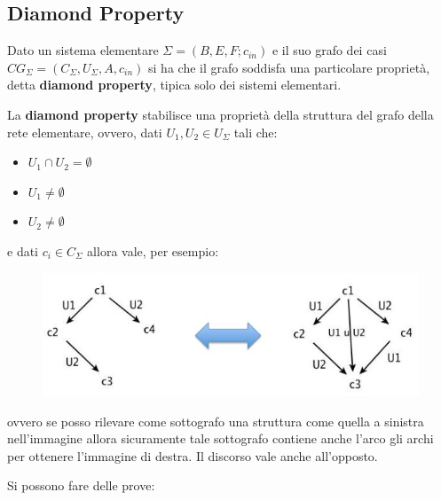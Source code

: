 \documentclass[a4paper,12pt, oneside]{book}
\begin{document}
\subsection{Diamond Property}
Dato un sistema elementare $\Sigma = (B,E,F;c_{in})$ e il suo grafo dei casi
$CG_\Sigma=(C_\Sigma, U_\Sigma, A, c_{in})$ si ha 
che il grafo soddisfa una particolare proprietà, detta \textbf{diamond
  property}, tipica solo dei sistemi elementari.
\begin{definizione}
  La \textbf{diamond property} stabilisce una proprietà della struttura del
  grafo della rete elementare, ovvero, dati $U_1,U_2\in U_\Sigma$ tali che:
  \begin{itemize}
    \item $U_1\cap U_2=\emptyset$
    \item $U_1\neq\emptyset$
    \item $U_2\neq\emptyset$
  \end{itemize}
  e dati $c_i\in C_\Sigma$ allora vale, per esempio:
  \begin{figure}[H]
    \centering
    \includegraphics[scale = 0.6]{img/diam.jpg}
  \end{figure}
  ovvero se posso rilevare come sottografo una struttura come quella a sinistra
  nell'immagine allora sicuramente tale sottografo contiene anche l'arco gli
  archi per ottenere l'immagine di destra. Il discorso vale anche all'opposto.
\end{definizione}
Si possono fare delle prove:
\end{document}
